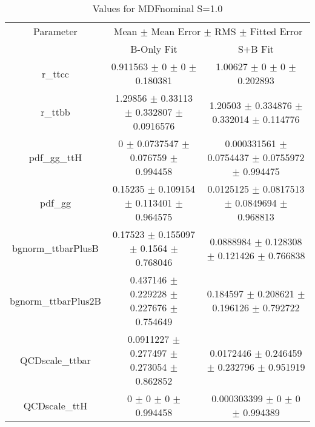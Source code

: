 \begin{table}
\centering
\caption{Values for MDFnominal S=1.0}
\begin{tabular}{ccc}
\toprule
Parameter & \multicolumn{2}{c}{Mean $\pm$ Mean Error $\pm$ RMS $\pm$ Fitted Error}\\
 & B-Only Fit & S+B Fit\\
\midrule
r\_ttcc & \num{0.911563} $\pm$ \num{0} $\pm$ \num{0} $\pm$ \num{0.180381} & \num{1.00627} $\pm$ \num{0} $\pm$ \num{0} $\pm$ \num{0.202893}\\
r\_ttbb & \num{1.29856} $\pm$ \num{0.33113} $\pm$ \num{0.332807} $\pm$ \num{0.0916576} & \num{1.20503} $\pm$ \num{0.334876} $\pm$ \num{0.332014} $\pm$ \num{0.114776}\\
pdf\_gg\_ttH & \num{0} $\pm$ \num{0.0737547} $\pm$ \num{0.076759} $\pm$ \num{0.994458} & \num{0.000331561} $\pm$ \num{0.0754437} $\pm$ \num{0.0755972} $\pm$ \num{0.994475}\\
pdf\_gg & \num{0.15235} $\pm$ \num{0.109154} $\pm$ \num{0.113401} $\pm$ \num{0.964575} & \num{0.0125125} $\pm$ \num{0.0817513} $\pm$ \num{0.0849694} $\pm$ \num{0.968813}\\
bgnorm\_ttbarPlusB & \num{0.17523} $\pm$ \num{0.155097} $\pm$ \num{0.1564} $\pm$ \num{0.768046} & \num{0.0888984} $\pm$ \num{0.128308} $\pm$ \num{0.121426} $\pm$ \num{0.766838}\\
bgnorm\_ttbarPlus2B & \num{0.437146} $\pm$ \num{0.229228} $\pm$ \num{0.227676} $\pm$ \num{0.754649} & \num{0.184597} $\pm$ \num{0.208621} $\pm$ \num{0.196126} $\pm$ \num{0.792722}\\
QCDscale\_ttbar & \num{0.0911227} $\pm$ \num{0.277497} $\pm$ \num{0.273054} $\pm$ \num{0.862852} & \num{0.0172446} $\pm$ \num{0.246459} $\pm$ \num{0.232796} $\pm$ \num{0.951919}\\
QCDscale\_ttH & \num{0} $\pm$ \num{0} $\pm$ \num{0} $\pm$ \num{0.994458} & \num{0.000303399} $\pm$ \num{0} $\pm$ \num{0} $\pm$ \num{0.994389}\\
\bottomrule
\end{tabular}
\end{table}